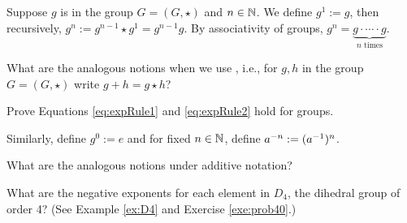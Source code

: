 \documentclass[../algebraNotesMSRI-UP2016.tex]{subfiles}
\begin{document}
\begin{frame}[c]
Suppose $g$ is in the group $G=(G,\star)$ and $n\in\mathbb N$.  We define $g^1:=g$, then recursively, $g^n:=g^{n-1}\star g^1=g^{n-1}g$.  By associativity of groups, $g^n=\underbrace{g\cdot\cdots \cdot g}_{\text{$n$ times}}$.

\smallGap
\begin{que}
What are the analogous notions when we use , i.e., for $g,h$ in the group $G=(G,\star)$ write $g+h=g\star h$?
\end{que}

\smallGap
\begin{exe}\label{exe:expRules1and2}
Prove Equations \eqref{eq:expRule1} and \eqref{eq:expRule2} hold for groups.
\end{exe}
\end{frame}

\begin{comment}
\begin{frame}[c]
In the reals we also had a notion of zero and negative exponents, namely, for $a\in\R$ and a positive integer $n$,
\[
a^0=1\qquad\text{ and }\qquad a^{-n}=\frac{1}{a^n}.
\]
We shall generalize this notion for groups.
\end{frame}

\begin{frame}[c]
Again, use multiplicative notation for the group $G$.  To stay consistent with the definition of a group and with our definition of positive exponents, we must have 
\[
g^0g = g^0g^1 = g^{0+1}=g =eg,
\]
where $e$ is the identity element.  We can right-cancel the $g$ in $g^0g=eg$ to conclude $g^0=e$.  This is why under multiplicative notation we often use $1$ to denote $e$.   
%
\end{frame}

\begin{frame}
Finally, for fixed $n\in\N$ we define $a^{-n}:=(a\1)^n$.  

\smallGap
\begin{exe}\label{exe:negExp}
Show that indeed this definition of $a^{-n}$ is consistent with the rules of exponents.  In other words, show Equations \eqref{eq:expRule1} and \eqref{eq:expRule2} still work for negative exponents.
\end{exe}
\end{comment}
\begin{frame}[c]
Similarly, define $g^0:=e$ and for fixed $n\in \mathbb N$, define $a^{-n}:=(a^{-1})^n$.

\smallGap
\begin{que}
What are the analogous notions under additive notation?
\end{que}

\smallGap
\begin{exe}\label{exe:negExpD4}
What are the negative exponents for each element in $D_4$, the dihedral group of order 4?  (See Example \ref{ex:D4} and Exercise \ref{exe:prob40}.)
\end{exe}
\end{frame}
\end{document}
